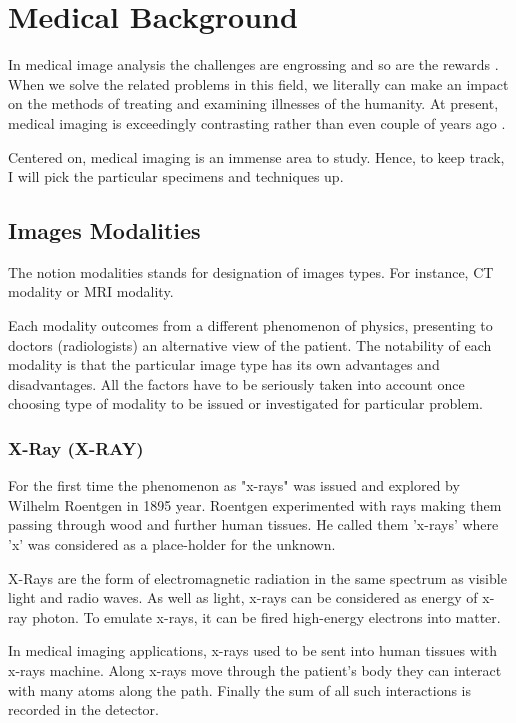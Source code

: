 \chapter{Medical Background}
\label{ch:rworks}

In medical image analysis the challenges are engrossing and so are the rewards \cite{Duncan2000}. When we solve the related problems in this field, we literally can make an impact on the methods of treating and examining illnesses of the humanity. At present, medical imaging is exceedingly contrasting rather than even couple of years ago \cite{Wang2020}. 

Centered on, medical imaging is an immense area to study. Hence, to keep track, I will pick the particular specimens and techniques up.

\section{Images Modalities}
The notion modalities \cite{Seeram2004} stands for designation of images types. For instance, CT modality or MRI modality. 

Each modality outcomes from a different phenomenon of physics, presenting to doctors (radiologists) an alternative view of the patient. The notability of each modality is that the particular image type has its own advantages and disadvantages. All the factors have to be seriously taken into account once choosing type of modality to be issued or investigated for particular problem.

\subsection{X-Ray (X-RAY)}
For the first time the phenomenon as "x-rays" was issued and explored by Wilhelm Roentgen in 1895 year. Roentgen experimented with rays making them passing through wood and further human tissues. He called them \cite{Barker1996} 'x-rays' where 'x' was considered as a place-holder for the unknown.

X-Rays are the form of electromagnetic radiation in the same spectrum as visible light and radio waves. As well as light, x-rays can be considered as energy of x-ray photon. To emulate x-rays, it can be fired high-energy electrons into matter. 

In medical imaging applications, x-rays used to be sent into human tissues with x-rays machine. Along x-rays move through the patient's body they can interact with many atoms along the path. Finally the sum of all such interactions is recorded in the detector. 

